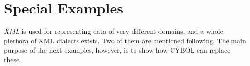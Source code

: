 %
%
%
%
%
%

\section{Special Examples}
\label{special_examples_heading}

\emph{XML} is used for representing data of very different domains, and a whole
plethora of XML dialects exists. Two of them are mentioned following. The main
purpose of the next examples, however, is to show how CYBOL can replace these.




